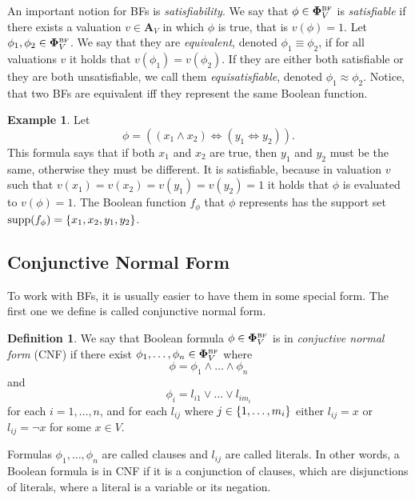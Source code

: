 \documentclass[
  digital, %
  color,
  twoside, %
  table,   %
  nolof,     %
  nolot,     %
]{fithesis3}
\let\setbuilder\set
\newcommand{\simpleset}[1]{\{{#1}\}}
\renewcommand{\set}[1]{\normalexpandarg\IfSubStr{#1}{|}{\setbuilder{#1}}{\simpleset{#1}}}
\theoremstyle{definition}
\newtheorem{definition}{Definition}
\newtheorem{example}{Example}
\theoremstyle{remark}
\newcommand{\BF}[1]{\mathbf{\Phi}_{#1}^{\normalfont{\text{\tiny BF}}}}
\newcommand{\valtns}[1]{\mathbf{A}_{#1}}
\newcommand{\supp}[1]{\mathrm{supp}(#1)}
\newcommand{\lequal}{\Leftrightarrow}
\begin{document}
An important notion for BFs is \emph{satisfiability}. We say that $\phi \in \BF{V}$ is \emph{satisfiable} if there exists a valuation $v \in \valtns{V}$ in which $\phi$ is true, that is $v(\phi) = 1$. Let $\phi_1, \phi_2 \in \BF{V}$. We say that they are \emph{equivalent}, denoted $\phi_1 \equiv \phi_2$, if for all valuations $v$ it holds that $v(\phi_1) = v(\phi_2)$. If they are either both satisfiable or they are both unsatisfiable, we call them \emph{equisatisfiable}, denoted $\phi_1 \approx \phi_2$. Notice, that two BFs are equivalent iff they represent the same Boolean function.

\begin{example}
\label{ex:BF:prenex}
Let
\[\phi = ((x_1 \land x_2) \lequal (y_1 \lequal y_2)).\]
This formula says that if both $x_1$ and $x_2$ are true, then $y_1$ and $y_2$ must be the same, otherwise they must be different. It is satisfiable, because in valuation $v$ such that $v(x_1) = v(x_2) = v(y_1) = v(y_2) = 1$ it holds that $\phi$ is evaluated to $v(\phi)=1$. The Boolean function $f_{\phi}$ that $\phi$ represents has the support set $\supp{f_{\phi}} = \set{x_1, x_2, y_1, y_2}$.
\end{example}

\subsection{Conjunctive Normal Form}
\label{sec:BF:CNF}
To work with BFs, it is usually easier to have them in some special form. The first one we define is called conjunctive normal form.

\begin{definition}
We say that Boolean formula $\phi \in \BF{V}$ is in \emph{conjuctive normal form} (CNF) if there exist $\phi_1,\dots,\phi_n \in \BF{V}$ where
\[\phi = \phi_1 \land \dots \land \phi_n\]
and
\[\phi_i = l_{i1} \lor \dots \lor l_{i{m_i}}\]
for each $i = 1, \dots, n$, and for each $l_{ij}$ where $j \in \set{1,\dots,m_i}$ either $l_{ij} = x$ or $l_{ij} = \neg x$ for some $x \in V$.
\end{definition}
Formulas $\phi_1,\dots,\phi_n$ are called clauses and $l_{ij}$ are called literals. In other words, a Boolean formula is in CNF if it is a conjunction of clauses, which are disjunctions of literals, where a literal is a variable or its negation.
\end{document}
